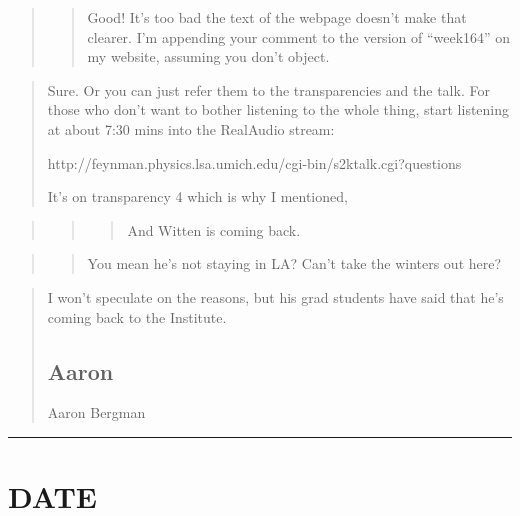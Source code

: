 \documentclass{article}
\begin{document}
\begin{quote}
\begin{quote}
Good! It's too bad the text of the webpage doesn't make that clearer.
I'm appending your comment to the version of ``week164'' on my website,
assuming you don't object.
\end{quote}
\end{quote}

\begin{quote}
Sure. Or you can just refer them to the transparencies and the talk. For
those who don't want to bother listening to the whole thing, start
listening at about 7:30 mins into the RealAudio stream:

http://feynman.physics.lsa.umich.edu/cgi-bin/s2ktalk.cgi?questions

It's on transparency 4 which is why I mentioned,
\end{quote}

\begin{quote}
\begin{quote}
\begin{quote}
And Witten is coming back.
\end{quote}
\end{quote}
\end{quote}

\begin{quote}
\begin{quote}
You mean he's not staying in LA? Can't take the winters out here?
\end{quote}
\end{quote}

\begin{quote}
I won't speculate on the reasons, but his grad students have said that
he's coming back to the Institute.

\hypertarget{aaron}{%
\subsection{Aaron}\label{aaron}}

Aaron Bergman
\end{quote}

\begin{center}\rule{0.5\linewidth}{0.5pt}\end{center}
\hypertarget{week165}{%
\section{DATE}\label{week165}}
\end{document}
